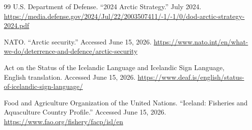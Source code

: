 \documentclass[11pt,a4paper]{article}
\begin{document}
\begin{thebibliography}{99}
U.S. Department of Defense. ``2024 Arctic Strategy.'' July 2024.
\url{https://media.defense.gov/2024/Jul/22/2003507411/-1/-1/0/dod-arctic-strategy-2024.pdf}

NATO. ``Arctic security.'' Accessed June 15, 2026.
\url{https://www.nato.int/en/what-we-do/deterrence-and-defence/arctic-security}

Act on the Status of the Icelandic Language and Icelandic Sign Language, English translation. Accessed June 15, 2026.
\url{https://www.deaf.is/english/status-of-icelandic-sign-language/}

Food and Agriculture Organization of the United Nations. ``Iceland: Fisheries and Aquaculture Country Profile.'' Accessed June 15, 2026.
\url{https://www.fao.org/fishery/facp/isl/en}

\end{thebibliography}
\endgroup
\end{document}
